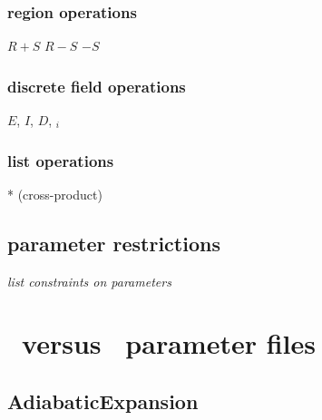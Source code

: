 \documentclass{book}
\begin{document}
\subsection{region operations}

$R + S$
$R - S$
$-S$

\subsection{discrete field operations}

$E$, $I$, $D$, $_i$

\subsection{list operations}

* (cross-product)

\section{parameter restrictions}

\todo \textit{list constraints on parameters}

\chapter{\enzo\ versus \cello\ parameter files}

\section{AdiabaticExpansion} \label{s:AdiabaticExpansion}

\subsection{\enzo}
\end{document}
